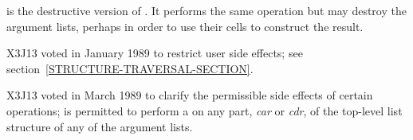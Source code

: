 \begin{defun}[Function]
 is the destructive version of .
It performs the same operation but may destroy the argument lists,
perhaps in order to use their cells to construct the result.

\begin{new}
X3J13 voted in January 1989
to restrict user side effects; see section~\ref{STRUCTURE-TRAVERSAL-SECTION}.
\end{new}

\begin{newer}
X3J13 voted in March 1989 
to clarify the permissible side effects of certain operations;
 is permitted to perform a  on any part,
\emph{car} or \emph{cdr}, of the top-level list structure of 
any of the argument lists.
\end{newer}
\end{defun}


